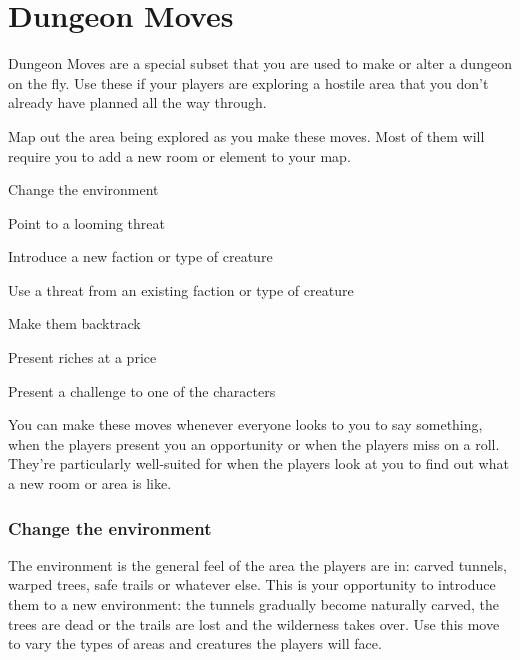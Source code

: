        
\section{Dungeon Moves}    
       

Dungeon Moves are a special subset that you are used to make or alter a dungeon on the fly. Use these if your players are exploring a hostile area that you don't already have planned all the way through.

       

Map out the area being explored as you make these moves. Most of them will require you to add a new room or element to your map.

       
\startitemize[1,packed]
         
\item Change the environment

         
\item Point to a looming threat

         
\item Introduce a new faction or type of creature

         
\item Use a threat from an existing faction or type of creature

         
\item Make them backtrack

         
\item Present riches at a price

         
\item Present a challenge to one of the characters

       
\stopitemize
       

You can make these moves whenever everyone looks to you to say something, when the players present you an opportunity or when the players miss on a roll. They're particularly well-suited for when the players look at you to find out what a new room or area is like.

       
\subsubsection{Change the environment}    
       

The environment is the general feel of the area the players are in: carved tunnels, warped trees, safe trails or whatever else. This is your opportunity to introduce them to a new environment: the tunnels gradually become naturally carved, the trees are dead or the trails are lost and the wilderness takes over. Use this move to vary the types of areas and creatures the players will face.

